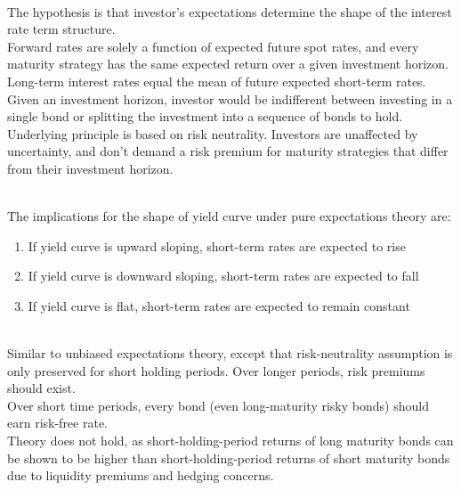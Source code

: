 \begin{remark} \\
The hypothesis is that investor's expectations determine the shape of the interest rate term structure.\\
Forward rates are solely a function of expected future spot rates, and every maturity strategy has the same expected return over a given investment horizon.\\
Long-term interest rates equal the mean of future expected short-term rates.\\
Given an investment horizon, investor would be indifferent between investing in a single bond or splitting the investment into a sequence of bonds to hold.\\
Underlying principle is based on risk neutrality. Investors are unaffected by uncertainty, and don't demand a risk premium for maturity strategies that differ from their investment horizon.
\end{remark}

\begin{remark} \\
The implications for the shape of yield curve under pure expectations theory are:
\begin{enumerate}[label=\roman*.]
\setlength{\itemsep}{0pt}
\item If yield curve is upward sloping, short-term rates are expected to rise
\item If yield curve is downward sloping, short-term rates are expected to fall
\item If yield curve is flat, short-term rates are expected to remain constant
\end{enumerate}
\end{remark}

\begin{remark} \\
Similar to unbiased expectations theory, except that risk-neutrality assumption is only preserved for short holding periods. Over longer periods, risk premiums should exist.\\
Over short time periods, every bond (even long-maturity risky bonds) should earn risk-free rate.\\
Theory does not hold, as short-holding-period returns of long maturity bonds can be shown to be higher than short-holding-period returns of short maturity bonds due to liquidity premiums and hedging concerns.
\end{remark}

